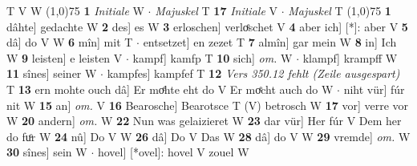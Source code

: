\documentclass[8pt,a4paper,notitlepage]{article}
\begin{document}
\begin{table}[ht]
\begin{minipage}[t]{0.5\linewidth}
T V W \newline
\line(1,0){75} \newline
\textbf{1} \textit{Initiale} W   $\cdot$ \textit{Majuskel} T  \textbf{17} \textit{Initiale} V   $\cdot$ \textit{Majuskel} T  \newline
\line(1,0){75} \newline
\textbf{1} dâhte] gedachte W \textbf{2} des] es W \textbf{3} erloschen] verloͤschet V \textbf{4} aber ich] [*]: aber V \textbf{5} dâ] do V W \textbf{6} mîn] mit T  $\cdot$ entsetzet] en zezet T \textbf{7} almîn] gar mein W \textbf{8} in] Ich W \textbf{9} leisten] e leisten V  $\cdot$ kampf] kamfp T \textbf{10} sich] \textit{om.} W  $\cdot$ klampf] krampff W \textbf{11} sînes] seiner W  $\cdot$ kampfes] kampfef T \textbf{12} \textit{Vers 350.12 fehlt (Zeile ausgespart)} T  \textbf{13} ern mohte ouch dâ] Er moͤhte eht do V Er moͤcht auch do W  $\cdot$ niht vür] fúr nit W \textbf{15} an] \textit{om.} V \textbf{16} Bearosche] Bearotsce T (V) betrosch W \textbf{17} vor] verre vor W \textbf{20} andern] \textit{om.} W \textbf{22} Nun was gelaizieret W \textbf{23} dar vür] Her fúr V Dem her do fuͦr W \textbf{24} nû] Do V W \textbf{26} dâ] Do V Das W \textbf{28} dâ] do V W \textbf{29} vremde] \textit{om.} W \textbf{30} sînes] sein W  $\cdot$ hovel] [*ovel]: hovel V zouel W \newline
\end{minipage}
\end{table}
\end{document}

